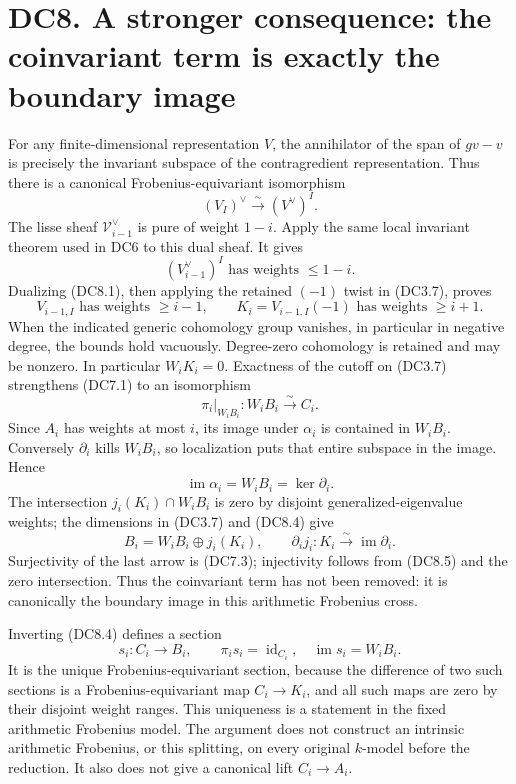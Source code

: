 \documentclass[
]{report}
\begin{document}
\section{DC8. A stronger consequence: the coinvariant term is exactly
the boundary
image}\label{dc8.-a-stronger-consequence-the-coinvariant-term-is-exactly-the-boundary-image}

For any finite-dimensional representation \(V\), the annihilator of the
span of \(gv-v\) is precisely the invariant subspace of the
contragredient representation. Thus there is a canonical
Frobenius-equivariant isomorphism \[
(V_I)^\vee\xrightarrow{\sim}(V^\vee)^I.
\tag{DC8.1}
\] The lisse sheaf \(\mathcal V_{i-1}^\vee\) is pure of weight \(1-i\).
Apply the same local invariant theorem used in DC6 to this dual sheaf.
It gives \[
(V_{i-1}^\vee)^I\text{ has weights }\le1-i.
\tag{DC8.2}
\] Dualizing (DC8.1), then applying the retained \((-1)\) twist in
(DC3.7), proves \[
V_{i-1,I}\text{ has weights }\ge i-1,
\qquad K_i=V_{i-1,I}(-1)\text{ has weights }\ge i+1.
\tag{DC8.3}
\] When the indicated generic cohomology group vanishes, in particular
in negative degree, the bounds hold vacuously. Degree-zero cohomology is
retained and may be nonzero. In particular \(W_iK_i=0\). Exactness of
the cutoff on (DC3.7) strengthens (DC7.1) to an isomorphism \[
\pi_i|_{W_iB_i}:W_iB_i\xrightarrow{\sim}C_i.
\tag{DC8.4}
\] Since \(A_i\) has weights at most \(i\), its image under \(\alpha_i\)
is contained in \(W_iB_i\). Conversely \(\partial_i\) kills \(W_iB_i\),
so localization puts that entire subspace in the image. Hence \[
\operatorname{im}\alpha_i=W_iB_i=\ker\partial_i.
\tag{DC8.5}
\] The intersection \(j_i(K_i)\cap W_iB_i\) is zero by disjoint
generalized-eigenvalue weights; the dimensions in (DC3.7) and (DC8.4)
give \[
B_i=W_iB_i\oplus j_i(K_i),\qquad
\partial_i j_i:K_i\xrightarrow{\sim}\operatorname{im}\partial_i.
\tag{DC8.6}
\] Surjectivity of the last arrow is (DC7.3); injectivity follows from
(DC8.5) and the zero intersection. Thus the coinvariant term has not
been removed: it is canonically the boundary image in this arithmetic
Frobenius cross.

Inverting (DC8.4) defines a section \[
s_i:C_i\longrightarrow B_i,\qquad
\pi_i s_i=\operatorname{id}_{C_i},\quad
\operatorname{im}s_i=W_iB_i.
\tag{DC8.7}
\] It is the unique Frobenius-equivariant section, because the
difference of two such sections is a Frobenius-equivariant map
\(C_i\to K_i\), and all such maps are zero by their disjoint weight
ranges. This uniqueness is a statement in the fixed arithmetic Frobenius
model. The argument does not construct an intrinsic arithmetic
Frobenius, or this splitting, on every original \(k\)-model before the
reduction. It also does not give a canonical lift \(C_i\to A_i\).
\end{document}
